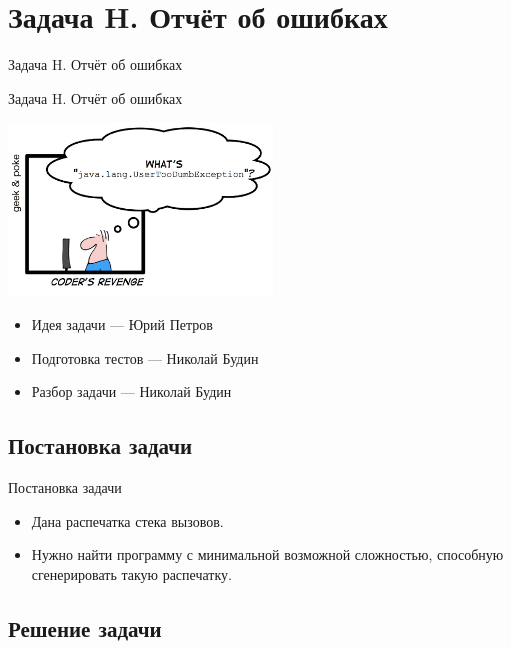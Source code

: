 \section{Задача H. Отчёт об ошибках}

\begin{frame}[t]{Задача H. Отчёт об ошибках}

  \begin{center}
    \LARGE Задача H. Отчёт об ошибках
  \end{center}
  \begin{center}
	  \includegraphics[width=7cm]{pics/log.png}
  \end{center}
\end{frame}

\begin{frame}[t]{}
  \vspace{3cm}
  \begin{itemize}
    \item Идея задачи --- Юрий Петров
    \item Подготовка тестов --- Николай Будин
    \item Разбор задачи --- Николай Будин
  \end{itemize}
\end{frame}

\subsection{Постановка задачи}

\begin{frame}[t]{Постановка задачи}
\begin{itemize}
    \item Дана распечатка стека вызовов.
    \item Нужно найти программу с минимальной возможной сложностью, способную сгенерировать такую распечатку.
\end{itemize}
\end{frame}

\subsection{Решение задачи}

